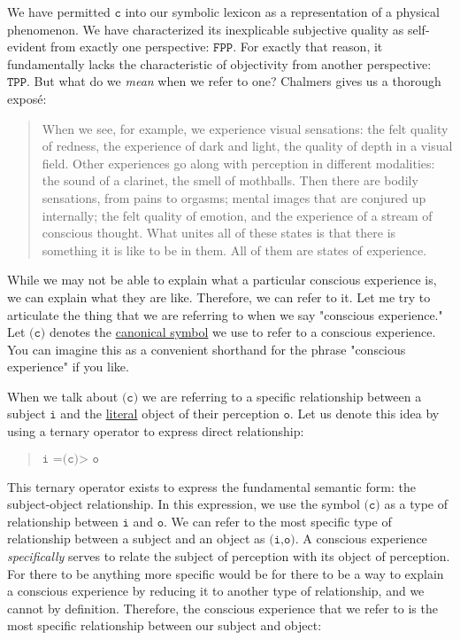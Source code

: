 \documentclass[runningheads]{llncs}
\begin{document}
We have permitted $\texttt{c}$ into our symbolic lexicon as a representation of a physical phenomenon. We have characterized its inexplicable subjective quality as self-evident from exactly one perspective: $\texttt{FPP}$. For exactly that reason, it fundamentally lacks the characteristic of objectivity from another perspective: $\texttt{TPP}$. But what do we \emph{mean} when we refer to one? Chalmers gives us a thorough exposé:

\begin{quote}
When we see, for example, we experience visual sensations: the felt quality of redness, the experience of dark and light, the quality of depth in a visual field. Other experiences go along with perception in different modalities: the sound of a clarinet, the smell of mothballs. Then there are bodily sensations, from pains to orgasms; mental images that are conjured up internally; the felt quality of emotion, and the experience of a stream of conscious thought. What unites all of these states is that there is something it is like to be in them. All of them are states of experience.
\end{quote}

While we may not be able to explain what a particular conscious experience is, we can explain what they are like. Therefore, we can refer to it. Let me try to articulate the thing that we are referring to when we say "conscious experience." Let $\texttt{(c)}$ denotes the \href{https://dna-platform.github.io/inexplicable-phenomena/dictionary/canonical-symbol.html}{canonical symbol}\xspace we use to refer to a conscious experience. You can imagine this as a convenient shorthand for the phrase "conscious experience" if you like.

When we talk about $\texttt{(c)}$ we are referring to a specific relationship between a subject $\texttt{i}$ and the \href{https://dna-platform.github.io/inexplicable-phenomena/dictionary/literal.html}{literal}\xspace object of their perception $\texttt{o}$. Let us denote this idea by using a ternary operator to express direct relationship:

\begin{quote}
$\texttt{i =(c)> o}$
\end{quote}

This ternary operator exists to express the fundamental semantic form: the subject-object relationship. In this expression, we use the symbol $\texttt{(c)}$ as a type of relationship between $\texttt{i}$ and $\texttt{o}$. We can refer to the most specific type of relationship between a subject and an object as $\texttt{(i,o)}$. A conscious experience \emph{specifically} serves to relate the subject of perception with its object of perception. For there to be anything more specific would be for there to be a way to explain a conscious experience by reducing it to another type of relationship, and we cannot by definition. Therefore, the conscious experience that we refer to is the most specific relationship between our subject and object:
\end{document}
